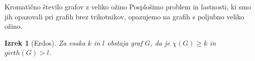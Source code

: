 \documentclass[t]{beamer} %
\newtheorem{izrek}{Izrek}
\begin{document}
\begin{frame}{Kromatično število grafov z veliko ožino}
  Posplošimo problem in lastnosti, ki smo jih opazovali pri grafih brez trikotnikov, opazujemo na grafih s poljubno veliko ožino.
  \begin{izrek}[Erdos]
    Za vsaka $k$ in $l$ obstaja graf $G$, da je $\chi(G) \geq k$ in $girth(G) > l$.
  \end{izrek}
\end{frame}
\end{document}
